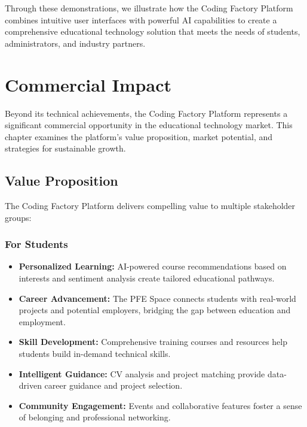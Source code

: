 \documentclass[12pt,a4paper]{report}
\begin{document}
Through these demonstrations, we illustrate how the Coding Factory Platform combines intuitive user interfaces with powerful AI capabilities to create a comprehensive educational technology solution that meets the needs of students, administrators, and industry partners.

\chapter{Commercial Impact}

Beyond its technical achievements, the Coding Factory Platform represents a significant commercial opportunity in the educational technology market. This chapter examines the platform's value proposition, market potential, and strategies for sustainable growth.

\section{Value Proposition}

The Coding Factory Platform delivers compelling value to multiple stakeholder groups:

\subsection{For Students}

\begin{itemize}
    \item \textbf{Personalized Learning:} AI-powered course recommendations based on interests and sentiment analysis create tailored educational pathways.

    \item \textbf{Career Advancement:} The PFE Space connects students with real-world projects and potential employers, bridging the gap between education and employment.

    \item \textbf{Skill Development:} Comprehensive training courses and resources help students build in-demand technical skills.

    \item \textbf{Intelligent Guidance:} CV analysis and project matching provide data-driven career guidance and project selection.

    \item \textbf{Community Engagement:} Events and collaborative features foster a sense of belonging and professional networking.
\end{itemize}
\end{document}
